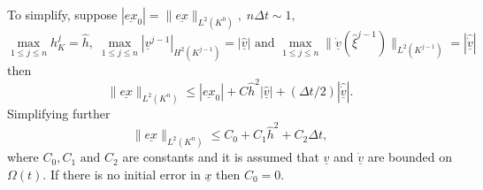 \documentclass[11pt]{article}
\newcommand{\D}{\Delta}
\newcommand{\ul}{\underline}
\newcommand{\Om}{\Omega}
\begin{document}
To simplify, suppose $|\ul{ex}_0| =    \|\ul{ex}\|_{L^{2}(K^0)}, \;n\D{t} \sim 1,$
$$\max_{1\leq{j}\leq {n}}h_K^j = \hat{h},\;\max_{1\leq{j}\leq{n}}|\ul{v}^{j-1}|_{H^2(K^{j-1})} = |\hat{\ul{v}}| \text{ and }  \max_{1\leq j \leq n}\|\dot{\ul{v}}(\hat{\xi}^{j-1})\|_{L^{2}(K^{j-1})} =   |\hat{\dot{\ul{v}}}|                                       $$  then
\begin{equation}
\label{eq:err4}
\|\ul{ex}\|_{L^{2}(K^n)} \leq{|\ul{ex}_0|} + C\hat{h}^2|\hat{\ul{v}}| + (\D{t}/2)|\hat{\dot{\ul{v}}}|.
\end{equation}
Simplifying further
\begin{equation}
\label{eq:err5}
\|\ul{ex}\|_{L^{2}(K^n)} \leq C_0 + C_1\hat{h}^2 + C_2\D{t},
\end{equation}
where $C_0, C_1 \text{ and } C_2$ are constants and it is assumed that $\ul{v}$ and $\dot{\ul{v}}$ are bounded on $\Om(t)$. If there is no initial error in $\ul{x}$ then $C_0=0$.
\end{document}
